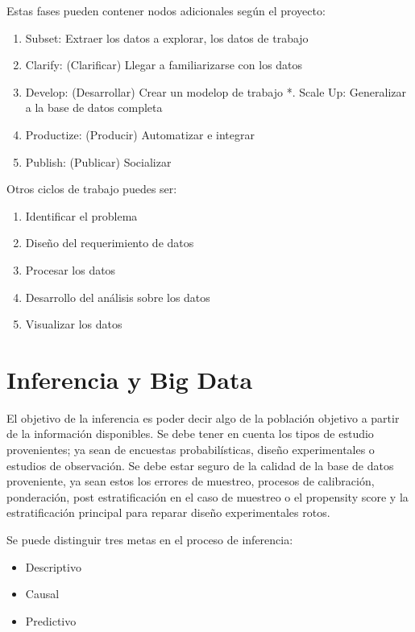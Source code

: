 \documentclass[
]{book}
\providecommand{\tightlist}{%
  \setlength{\itemsep}{0pt}\setlength{\parskip}{0pt}}
\begin{document}
Estas fases pueden contener nodos adicionales según el proyecto:

\begin{enumerate}
\def\labelenumi{\arabic{enumi}.}
\setcounter{enumi}{-1}
\tightlist
\item
  Subset: Extraer los datos a explorar, los datos de trabajo
\item
  Clarify: (Clarificar) Llegar a familiarizarse con los datos
\item
  Develop: (Desarrollar) Crear un modelop de trabajo
  *. Scale Up: Generalizar a la base de datos completa
\item
  Productize: (Producir) Automatizar e integrar
\item
  Publish: (Publicar) Socializar
\end{enumerate}

Otros ciclos de trabajo puedes ser:

\begin{enumerate}
\def\labelenumi{\arabic{enumi}.}
\tightlist
\item
  Identificar el problema
\item
  Diseño del requerimiento de datos
\item
  Procesar los datos
\item
  Desarrollo del análisis sobre los datos
\item
  Visualizar los datos
\end{enumerate}

\hypertarget{inferencia-y-big-data}{%
\section{Inferencia y Big Data}\label{inferencia-y-big-data}}

El objetivo de la inferencia es poder decir algo de la población objetivo a partir de la información disponibles. Se debe tener en cuenta los tipos de estudio provenientes; ya sean de encuestas probabilísticas, diseño experimentales o estudios de observación. Se debe estar seguro de la calidad de la base de datos proveniente, ya sean estos los errores de muestreo, procesos de calibración, ponderación, post estratificación en el caso de muestreo o el propensity score y la estratificación principal para reparar diseño experimentales rotos.

Se puede distinguir tres metas en el proceso de inferencia:

\begin{itemize}
\tightlist
\item
  Descriptivo
\item
  Causal
\item
  Predictivo
\end{itemize}
\end{document}

